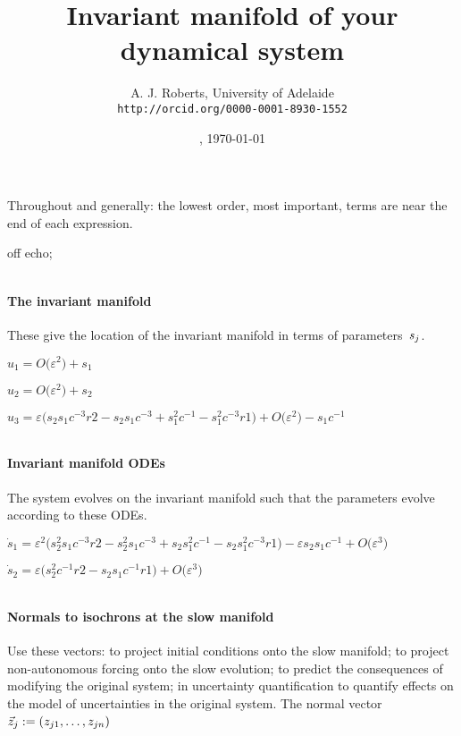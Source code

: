 \documentclass[11pt,a5paper]{article}
\title{Invariant manifold of your dynamical system}
\author{A. J. Roberts, University of Adelaide\\
\texttt{http://orcid.org/0000-0001-8930-1552}}
\date{\now, \today}
\def\eps{\varepsilon}
\begin{document}
\maketitle
Throughout and generally: the lowest order, most
important, terms are near the end of each expression.


off echo;


\(
\)
\paragraph{The invariant manifold}
These give the location of the invariant manifold in
terms of parameters~\(s\sb j\).
\(
\)\par

\(u_{1}=O\big(\varepsilon ^{2}\big)+s_{1}
\)\par

\(u_{2}=O\big(\varepsilon ^{2}\big)+s_{2}
\)\par

\(u_{3}=\eps \big(s_{2} s_{1} c^{-3} r2-s_{2} s_{1} c^{-3}+s_{1}^{2} c^{-1
}-s_{1}^{2} c^{-3} r1\big)+O\big(\varepsilon ^{2}\big)-s_{1} c^{-1}
\)\par

\(
\)
\paragraph{Invariant manifold ODEs}
The system evolves on the invariant manifold such
that the parameters evolve according to these ODEs.
\(
\)\par

\(\dot s_{1}=\eps^{2} \big(s_{2}^{2} s_{1} c^{-3} r2-s_{2}^{2} s_{1} c^{-3
}+s_{2} s_{1}^{2} c^{-1}-s_{2} s_{1}^{2} c^{-3} r1\big)-\eps s_{2} s_{1}
 c^{-1}+O\big(\varepsilon ^{3}\big)
\)\par

\(\dot s_{2}=\eps \big(s_{2}^{2} c^{-1} r2-s_{2} s_{1} c^{-1} r1\big)+O
\big(\varepsilon ^{3}\big)
\)\par

\(
\)
\paragraph{Normals to isochrons at the slow manifold}
Use these vectors: to project initial conditions
onto the slow manifold; to project non-autonomous
forcing onto the slow evolution; to predict the
consequences of modifying the original system; in
uncertainty quantification to quantify effects on
the model of uncertainties in the original system.
The normal vector \(\vec z\sb j:=(z\sb{j1},\ldots,z\sb{jn})\)
\(
\)\par
\end{document}
